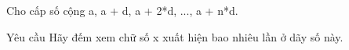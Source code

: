 Cho cấp số cộng a, a + d, a + 2*d, ..., a + n*d.  

Yêu cầu
Hãy đếm xem chữ số x xuất hiện bao nhiêu lần ở dãy số này.